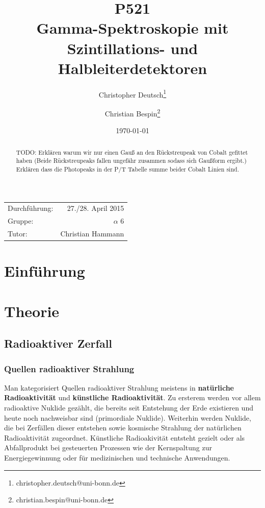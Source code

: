\documentclass[11pt, a4paper]{article}
\title{P521 \\ Gamma-Spektroskopie mit Szintillations- und Halbleiterdetektoren}
\author{Christopher Deutsch\footnote{christopher.deutsch@uni-bonn.de} \and Christian Bespin\footnote{christian.bespin@uni-bonn.de}}
\date{\today}
\numberwithin{equation}{section}
\begin{document}
\begin{titlepage}

\maketitle

\begin{center}
\begin{tabular}{l r}
Durchführung: & 27./28. April 2015 \\
Gruppe: & $\alpha$ 6 \\
Tutor: & Christian Hammann
\end{tabular}
\end{center}

\begin{abstract}
\noindent
TODO: Erklären warum wir nur einen Gauß an den Rückstreupeak von Cobalt gefittet haben (Beide Rückstreupeaks fallen ungefähr zusammen sodass sich Gaußform ergibt.)
Erklären dass die Photopeaks in der P/T Tabelle summe beider Cobalt Linien sind.

\end{abstract}

\end{titlepage}

\tableofcontents
\newpage


\section{Einführung}

\section{Theorie}

\subsection{Radioaktiver Zerfall}

\subsubsection{Quellen radioaktiver Strahlung}
\label{sssec:quellen_radioaktivität}
Man kategorisiert Quellen radioaktiver Strahlung meistens in \textbf{natürliche Radioaktivität} und \textbf{künstliche Radioaktivität}.
Zu ersterem werden vor allem radioaktive Nuklide gezählt, die bereits seit Entstehung der Erde existieren und heute noch nachweisbar sind (primordiale Nuklide).
Weiterhin werden Nuklide, die bei Zerfällen dieser entstehen sowie kosmische Strahlung der natürlichen Radioaktivität zugeordnet.
Künstliche Radioakivität entsteht gezielt oder als Abfallprodukt bei gesteuerten Prozessen wie der Kernspaltung zur Energiegewinnung oder für medizinischen und technische Anwendungen.
\end{document}

